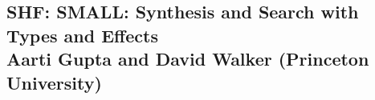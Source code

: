 \documentclass[11pt]{article}
\newcommand{\mytitle}{Synthesis and Search with Types and Effects}
\begin{document}

%

\newpage
{}
\setcounter{page}{1}

\begin{centering}
\section*{{\LARGE  SHF: SMALL: \mytitle}  \\ 
   {\normalsize Aarti Gupta and David Walker (Princeton University)} }
\end{centering}

\makeatletter
\renewcommand{\paragraph}{%
  \@startsection{paragraph}{4}%
  {\z@}{0.5ex \@plus 0.5ex \@minus .2ex}{-1em}%
  {\normalfont\normalsize\bfseries}%
}
\makeatother



%

\newpage

\setcounter{page}{1}



\newpage
\end{document}
